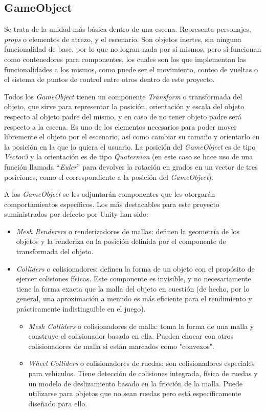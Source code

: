 \subsection{GameObject}

Se trata de la unidad más básica dentro de una escena. Representa personajes, \textit{props} o elementos de atrezo, y el escenario. Son objetos inertes, sin ninguna funcionalidad de base, por lo que no logran nada por sí mismos, pero sí funcionan como contenedores para componentes, los cuales son los que implementan las funcionalidades a los mismos, como puede ser el movimiento, conteo de vueltas o el sistema de puntos de control entre otros dentro de este proyecto.

Todos los \textit{GameObject} tienen un componente \textit{Transform} o transformada del objeto, que sirve para representar la posición, orientación y escala del objeto respecto al objeto padre del mismo, y en caso de no tener objeto padre será respecto a la escena. Es uno de los elementos necesarios para poder mover libremente el objeto por el escenario, así como cambiar su tamaño y orientarlo en la posición en la que lo quiera el usuario. La posición del \textit{GameObject} es de tipo \textit{Vector3} y la orientación es de tipo \textit{Quaternion} (en este caso se hace uso de una función llamada ``\textit{Euler}'' para devolver la rotación en grados en un vector de tres posiciones, como el correspondiente a la posición del \textit{GameObject}).

A los \textit{GameObject} se les adjuntarán componentes que les otorgarán comportamientos específicos. Los más destacables para este proyecto suministrados por defecto por Unity han sido: 
\begin{itemize}
\tightlist
    \item \textit{Mesh Renderers} o renderizadores de mallas: definen la geometría de los objetos y la renderiza en la posición definida por el componente de transformada del objeto.
    \item \textit{Colliders} o colisionadores: definen la forma de un objeto con el propósito de ejercer colisiones físicas. Este componente es invisible, y no necesariamente tiene la forma exacta que la malla del objeto en cuestión (de hecho, por lo general, una aproximación a menudo es más eficiente para el rendimiento y prácticamente indistinguible en el juego).
   	\begin{itemize}
   	\tightlist
   		    \item \textit{Mesh Colliders} o colisionadores de malla: toma la forma de una malla y construye el colisionador basado en ella. Pueden chocar con otros colisionadores de malla si están marcados como "convexos".
   		    \item \textit{Wheel Colliders} o colisionadores de ruedas: son colisionadores especiales para vehículos. Tiene detección de colisiones integrada, física de ruedas y un modelo de deslizamiento basado en la fricción de la malla. Puede utilizarse para objetos que no sean ruedas pero está específicamente diseñado para ello.
   	\end{itemize}
\end{itemize}

